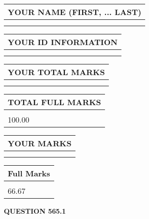 \documentclass{ctexart}
\begin{document}
   
   
   
\newpage 
\setcounter{page}{ 
   565001 } 
   
   
   
   
\noindent\begin{tabular}{|l|}
\hline
YOUR NAME (FIRST, ... LAST)  \\
\hline
 \\ 
 \\ 
\hline
\end{tabular}
\hspace{0.05in} \begin{tabular}{|l|}
\hline
 YOUR   ID   INFORMATION  \\
\hline
 \\ 
 \\ 
\hline
\end{tabular}
   
   
\vspace{0.2in}\noindent\begin{tabular}{|l|}
\hline
YOUR TOTAL MARKS  \\
\hline
 \\ 
 \\ 
\hline
\end{tabular}
\hspace{0.05in} \begin{tabular}{|l|}
\hline
TOTAL FULL MARKS  \\
\hline
 \\ 
100.00 \\
\hline
\end{tabular}
   
   
 \vspace{0.2in}
 
 
 
 
   
   
  
\vspace{0.2in}
  
\noindent\begin{tabular}{|l|}
\hline
 YOUR MARKS  \\
\hline
 \\ 
 \\ 
\hline
\end{tabular}
\hspace{0.05in} \begin{tabular}{|l|}
\hline
 Full Marks  \\
\hline
 \\ 
66.67 \\
\hline
\end{tabular}
{\textbf{\Large{QUESTION
565.1 
}}}
  
\end{document}
